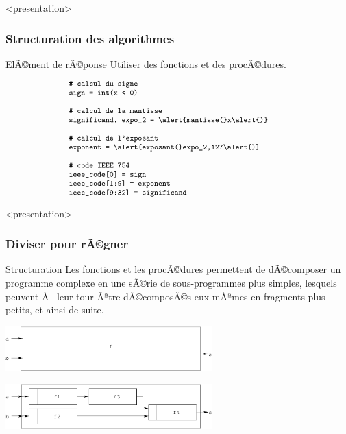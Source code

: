 \begin{frame}<presentation>
\frametitle{Structuration des algorithmes}
\begin{block}{ElÃ©ment de rÃ©ponse}
Utiliser des fonctions et des procÃ©dures.
\end{block}
\pause

$$\begin{minipage}{8cm}\footnotesize\tt
\# calcul du signe\\
sign = int(x < 0)\\
\mbox{}\\ 
\# calcul de la mantisse\\
significand, expo\_2 = \alert{mantisse(}x\alert{)}\\
\mbox{}\\ 
\# calcul de l'exposant\\
exponent = \alert{exposant(}expo\_2,127\alert{)}\\
\mbox{}\\
\# code IEEE 754\\
ieee\_code[0] = sign\\
ieee\_code[1:9] = exponent\\
ieee\_code[9:32] = significand
\end{minipage}$$
    
\end{frame}

\begin{frame}<presentation>
\frametitle{Diviser pour rÃ©gner}
\begin{block}{Structuration}
Les fonctions et les procÃ©dures permettent de dÃ©composer un programme complexe en une 
sÃ©rie de sous-programmes plus simples, lesquels peuvent Ã  leur tour Ãªtre dÃ©composÃ©s 
eux-mÃªmes en fragments plus petits, et ainsi de suite.  
\end{block}
\pause

\centerline{\includegraphics[width=8cm]{../fig/structure1.pdf}}
\pause 

\centerline{\includegraphics[width=8cm]{../fig/structure2.pdf}}

\end{frame}
\note{} 



